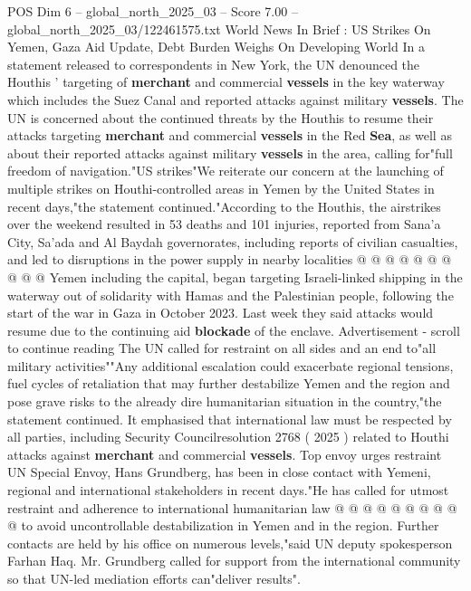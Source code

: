 \begin{textsample}{POS Dim 6 – global\_north\_2025\_03 – Score 7.00 – global\_north\_2025\_03/122461575.txt}  \label{ex:f6_pos_221}
World News In Brief : US Strikes On Yemen, Gaza Aid Update, Debt Burden Weighs On Developing World In a statement released to correspondents in New York, the UN denounced the Houthis ' targeting of \textbf{merchant} and commercial \textbf{vessels} in the key waterway which includes the Suez Canal and reported attacks against military \textbf{vessels}.
The UN is concerned about the continued threats by the Houthis to resume their attacks targeting \textbf{merchant} and commercial \textbf{vessels} in the Red \textbf{Sea}, as well as about their reported attacks against military \textbf{vessels} in the area, calling for"full freedom of navigation."US strikes"We reiterate our concern at the launching of multiple strikes on Houthi-controlled areas in Yemen by the United States in recent days,"the statement continued."According to the Houthis, the airstrikes over the weekend resulted in 53 deaths and 101 injuries, reported from Sana'a City, Sa'ada and Al Baydah governorates, including reports of civilian casualties, and led to disruptions in the power supply in nearby localities @ @ @ @ @ @ @ @ @ @ Yemen including the capital, began targeting Israeli-linked shipping in the waterway out of solidarity with Hamas and the Palestinian people, following the start of the war in Gaza in October 2023.
Last week they said attacks would resume due to the continuing aid \textbf{blockade} of the enclave.
Advertisement - scroll to continue reading The UN called for restraint on all sides and an end to"all military activities""Any additional escalation could exacerbate regional tensions, fuel cycles of retaliation that may further destabilize Yemen and the region and pose grave risks to the already dire humanitarian situation in the country,"the statement continued.
It emphasised that international law must be respected by all parties, including Security Councilresolution 2768 ( 2025 ) related to Houthi attacks against \textbf{merchant} and commercial \textbf{vessels}.
Top envoy urges restraint UN Special Envoy, Hans Grundberg, has been in close contact with Yemeni, regional and international stakeholders in recent days."He has called for utmost restraint and adherence to international humanitarian law @ @ @ @ @ @ @ @ @ @ to avoid uncontrollable destabilization in Yemen and in the region.
Further contacts are held by his office on numerous levels,"said UN deputy spokesperson Farhan Haq.
Mr.
Grundberg called for support from the international community so that UN-led mediation efforts can"deliver results".

\end{textsample}
